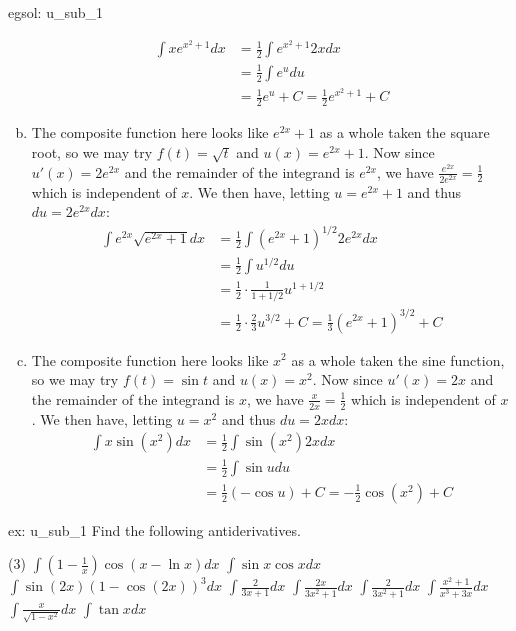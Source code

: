 \begin{egsol}[]{egsol: u_sub_1}
\begin{enumerate}[a)]
        \begin{align*}
            \int xe^{x^2+1} dx &= \frac{1}{2}\int e^{x^2+1} 2xdx\\
            &= \frac{1}{2}\int e^u du\\
            &= \frac{1}{2} e^u + C = \frac{1}{2} e^{x^2+1} + C
        \end{align*}
        \item The composite function here looks like $e^{2x}+1$ as a whole taken the square root, so we may try $f(t) = \sqrt{t}$ and $u(x) = e^{2x}+1$.  Now since $u'(x) = 2e^{2x}$ and the remainder of the integrand is $e^{2x}$, we have $\frac{e^{2x}}{2e^{2x}} = \frac{1}{2}$ which is independent of $x$.  We then have, letting $u = e^{2x} + 1$ and thus $du = 2e^{2x}dx$:
        \begin{align*}
            \int e^{2x}\sqrt{e^{2x}+1} dx &= \frac{1}{2}\int (e^{2x}+1)^{1/2} 2e^{2x}dx\\
            &= \frac{1}{2}\int u^{1/2} du\\
            &= \frac{1}{2}\cdot\frac{1}{1+1/2} u^{1+1/2} \\
            &= \frac{1}{2}\cdot\frac{2}{3} u^{3/2} + C = \frac{1}{3} (e^{2x}+1)^{3/2} + C
        \end{align*}
        \item The composite function here looks like $x^2$ as a whole taken the sine function, so we may try $f(t) = \sin t$ and $u(x) = x^2$.  Now since $u'(x) = 2x$ and the remainder of the integrand is $x$, we have $\frac{x}{2x} = \frac{1}{2}$ which is independent of $x$.  We then have, letting $u = x^2$ and thus $du = 2xdx$:
        \begin{align*}
            \int x \sin(x^2) dx &= \frac{1}{2}\int \sin(x^2) 2xdx\\
            &= \frac{1}{2}\int \sin u du\\
            &= \frac{1}{2} (-\cos u) + C = -\frac{1}{2} \cos(x^2) + C
        \end{align*}
    \end{enumerate}
\end{egsol}

\begin{ex}[]{ex: u_sub_1}
    Find the following antiderivatives.
    \begin{tasks}(3)
        \task $\int (1-\frac{1}{x}) \cos (x - \ln x) dx$
        \task $\int \sin x \cos x dx$
        \task $\int \sin(2x) (1 - \cos(2x))^3 dx$
        \task $\int \frac{2}{3x + 1} dx$
        \task $\int \frac{2x}{3x^2 + 1} dx$
        \task $\int \frac{2}{3x^2 + 1} dx$
        \task $\int \frac{x^2 + 1}{x^3 + 3x} dx$
        \task $\int \frac{x}{\sqrt{1-x^2}} dx$ 
        \task $\int \tan x dx$ 
    \end{tasks}
\end{ex}


